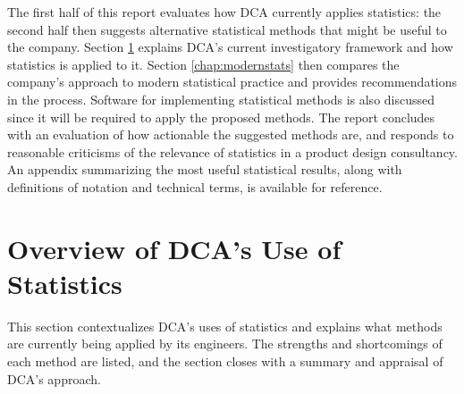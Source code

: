 \documentclass[11pt,a4paper,article]{memoir} %
\begin{document}
\par
The first half of this report evaluates how DCA currently applies statistics: the second half then suggests alternative statistical methods that might be useful to the company. Section \ref{chap:dca} explains DCA's current investigatory framework and how statistics is applied to it. Section \ref{chap:modernstats} then compares the company's approach to modern statistical practice and provides recommendations in the process. Software for implementing statistical methods is also discussed since it will be required to apply the proposed methods. The report concludes with an evaluation of how actionable the suggested methods are, and responds to reasonable criticisms of the relevance of statistics in a product design consultancy. An appendix summarizing the most useful statistical results, along with definitions of notation and technical terms, is available for reference.

\newpage



\chapter {Overview of DCA's Use of Statistics}
\label{chap:dca}
This section contextualizes DCA's uses of statistics and explains what methods are currently being applied by its engineers. The strengths and shortcomings of each method are listed, and the section closes with a summary and appraisal of DCA's approach.
\end{document}
